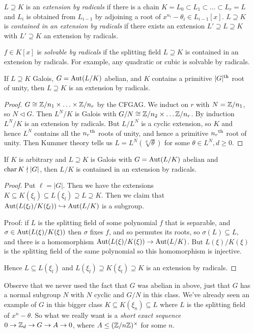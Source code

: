 \documentclass[10pt,a4paper]{article}
\begin{document}
$L\supseteq K$ is an \emph{extension by radicals} if there is a chain $K = L_0 \subset L_1 \subset \ldots \subset L_r = L$ and $L_i$ is obtained from $L_{i-1}$ by adjoining a root of $x^{n_i} - \theta_i \in L_{i-1}[x]$. $L \supseteq K$ is \emph{contained in an extension by radicals} if there exists an extension $L' \supseteq L \supseteq K$ with $L'\supseteq K$ an extension by radicals.

$f \in K[x]$ is \emph{solvable by radicals} if the splitting field $L \supseteq K$ is contained in an extension by radicals. For example, any quadratic or cubic is solvable by radicals.

\begin{lemma}
If $L \supseteq K$ Galois, $G = \operatorname{Aut}(L/K)$ abelian, and $K$ contains a primitive $|G|\textsuperscript{th}$ root of unity, then $L \supseteq K$ is an extension by radicals.
\end{lemma}
\begin{proof}
$G \cong \mathbb{Z}/n_1 \times \ldots \times \mathbb{Z}/n_r$ by the CFGAG. We induct on $r$ with $N = \mathbb{Z}/n_1$, so $N \triangleleft G$. Then $L^N/K$ is Galois with $G/N \cong \mathbb{Z}/n_2 \times \ldots \mathbb{Z}/n_r$. By induction $L^N/K$ is an extension by radicals. But $L/L^N$ is a cyclic extension, so $K$ and hence $L^N$ contains all the $n_r\textsuperscript{th}$ roots of unity, and hence a primitive $n_r\textsuperscript{th}$ root of unity. Then Kummer theory tells us $L = L^N(\sqrt[d]{\theta})$ for some $\theta \in L^N, d \geq 0$.
\end{proof}

\begin{corollary}
If $K$ is arbitrary and $L \supseteq K$ is Galois with $G = \operatorname{Aut}(L/K)$ abelian and $\operatorname{char} K \nmid |G|$, then $L/K$ is contained in an extension by radicals.
\end{corollary}
\begin{proof}
Put $\ell = |G|$. Then we have the extensions $K \subseteq K(\xi_l) \subseteq L(\xi_l) \supseteq L \supseteq K$. Then we claim that $\operatorname{Aut}(L(\xi_l)/K(\xi_l)) \hookrightarrow \operatorname{Aut}(L/K)$ is a subgroup.

Proof: if $L$ is the splitting field of some polynomial $f$ that is separable, and $\sigma \in \operatorname{Aut}(L(\xi)/K(\xi))$ then $\sigma$ fixes $f$, and so permutes its roots, so $\sigma(L)\subseteq L$, and there is a homomorphism $\operatorname{Aut}(L(\xi)/K(\xi)) \to \operatorname{Aut}(L/K)$. But $L(\xi)/K(\xi)$ is the splitting field of the same polynomial so this homomorphism is injective.

Hence $L \subseteq L(\xi_l)$ and $L(\xi_l) \supseteq K(\xi_l) \supseteq K$ is an extension by radicals.
\end{proof}
Observe that we never used the fact that $G$ was abelian in above, just that $G$ has a normal subgroup $N$ with $N$ cyclic and $G/N$ in this class. We've already seen an example of $G$ in this bigger class $K \subseteq K(\xi_n) \subseteq L$ where $L$ is the splitting field of $x^n-\theta$. So what we really want is a \emph{short exact sequence} $0 \to \mathbb{Z}_d \to G \to A \to 0$, where $A \leq (\mathbb{Z}/n\mathbb{Z})^{\times}$ for some $n$.
\end{document}

